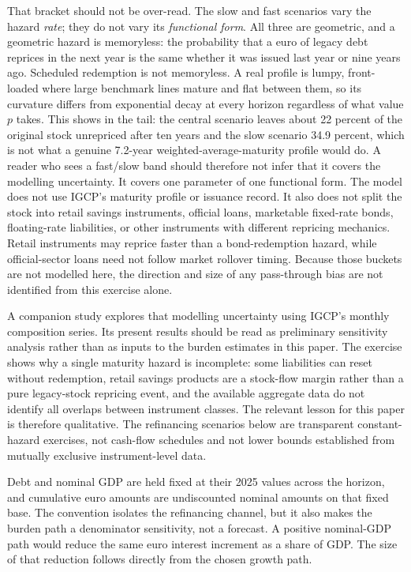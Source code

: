 \documentclass[11pt,a4paper]{article}
\begin{document}
That bracket should not be over-read. The slow and fast scenarios vary the
hazard \emph{rate}; they do not vary its \emph{functional form}. All three are
geometric, and a geometric hazard is memoryless: the probability that a euro of
legacy debt reprices in the next year is the same whether it was issued last
year or nine years ago. Scheduled redemption is not memoryless. A real profile
is lumpy, front-loaded where large benchmark lines mature and flat between
them, so its curvature differs from exponential decay at every horizon
regardless of what value $p$ takes. This shows in the tail: the central
scenario leaves about 22 percent of the original stock unrepriced after ten
years and the slow scenario 34.9 percent, which is not what a genuine 7.2-year
weighted-average-maturity profile would do. A reader who sees a fast/slow band
should therefore not infer that it covers the modelling uncertainty. It covers
one parameter of one functional form. The model does not use IGCP's maturity
profile or issuance record. It also does not split the stock into retail
savings instruments, official loans, marketable fixed-rate bonds, floating-rate
liabilities, or other instruments with different repricing mechanics. Retail
instruments may reprice faster than a bond-redemption hazard, while
official-sector loans need not follow market rollover timing. Because those
buckets are not modelled here, the direction and size of any pass-through bias
are not identified from this exercise alone.

A companion study \cite{ribeiro_repricing} explores that modelling uncertainty
using IGCP's monthly composition series. Its present results should be read as
preliminary sensitivity analysis rather than as inputs to the burden estimates
in this paper. The exercise shows why a single maturity hazard is incomplete:
some liabilities can reset without redemption, retail savings products are a
stock-flow margin rather than a pure legacy-stock repricing event, and the
available aggregate data do not identify all overlaps between instrument
classes. The relevant lesson for this paper is therefore qualitative. The
refinancing scenarios below are transparent constant-hazard exercises, not
cash-flow schedules and not lower bounds established from mutually exclusive
instrument-level data.

Debt and nominal GDP are held fixed at their 2025 values across the horizon,
and cumulative euro amounts are undiscounted nominal amounts on that fixed
base. The convention isolates the refinancing channel, but it also makes the
burden path a denominator sensitivity, not a forecast. A positive
nominal-GDP path would reduce the same euro interest increment as a share of
GDP. The size of that reduction follows directly from the chosen growth path.
\end{document}
